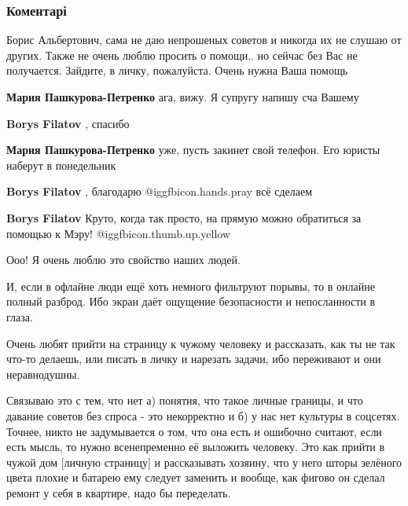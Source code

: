  
 
 
 
 
\subsubsection{Коментарі}

\begin{itemize} %

Борис Альбертович, сама не даю непрошеных советов и никогда их не слушаю от других.
Также не очень люблю просить о помощи.. но сейчас без Вас не получается. Зайдите, в личку, пожалуйста. Очень нужна Ваша помощь

\begin{itemize} %
\textbf{Мария Пашкурова-Петренко} ага, вижу.
Я супругу напишу сча Вашему

\textbf{Borys Filatov} , спасибо


\textbf{Мария Пашкурова-Петренко} уже, пусть закинет свой телефон. Его юристы наберут в понедельник

\textbf{Borys Filatov} , благодарю  @igg{fbicon.hands.pray}  всё сделаем

\textbf{Borys Filatov} Круто, когда так просто, на прямую можно обратиться за помощью к Мэру!  @igg{fbicon.thumb.up.yellow} 
\end{itemize} %


Ооо! Я очень люблю это свойство наших людей.

И, если в офлайне люди ещё хоть немного фильтруют порывы, то в онлайне полный
разброд. Ибо экран даёт ощущение безопасности и непосланности в глаза.

Очень любят прийти на страницу к чужому человеку и рассказать, как ты не так
что-то делаешь, или писать в личку и нарезать задачи, ибо переживают и они
неравнодушны.

Связываю это с тем, что нет а) понятия, что такое личные границы, и что давание
советов без спроса - это некорректно и б) у нас нет культуры в соцсетях.
Точнее, никто не задумывается о том, что она есть и ошибочно считают, если есть
мысль, то нужно всенепременно её выложить человеку. Это как прийти в чужой дом
[личную страницу] и рассказывать хозяину, что у него шторы зелёного цвета
плохие и батарею ему следует заменить и вообще, как фигово он сделал ремонт у
себя в квартире, надо бы переделать.


\end{itemize}
